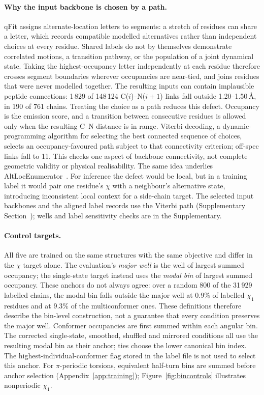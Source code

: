 \documentclass[10pt,twocolumn,a4paper]{article}
\begin{document}
\paragraph{Why the input backbone is chosen by a path.} qFit assigns alternate-location
letters to segments: a stretch of residues can share a letter, which records
compatible modelled alternatives rather than independent choices at every residue.
Shared labels do not by themselves demonstrate correlated motions, a transition
pathway, or the population of a joint dynamical state. Taking the
highest-occupancy letter independently at each residue therefore crosses segment
boundaries wherever occupancies are near-tied, and joins residues that were never
modelled together. The resulting inputs can contain implausible peptide connections: 1\,829
of 148\,124 C($i$)--N($i{+}1$) links fall outside 1.20--1.50\,\AA, in 190 of 761 chains.
Treating the choice as a path reduces this defect. Occupancy is the emission score,
and a transition between consecutive residues is allowed only when the resulting
C--N distance is in range. Viterbi decoding, a dynamic-programming algorithm for selecting the best connected sequence of choices, selects an occupancy-favoured path
subject to that connectivity criterion; off-spec links fall to 11. This checks one
aspect of backbone connectivity, not complete geometric validity or physical
realisability.
 The same idea underlies
AltLocEnumerator~\citep{gutermuth2023altloc}. For inference the defect would be local,
but in a training label it would pair one residue's $\chi$ with a neighbour's
alternative state, introducing inconsistent local context for a side-chain target.
The selected input backbones and the aligned label records use the Viterbi path (Supplementary Section~); wells and label sensitivity checks
are in the Supplementary.

\paragraph{Control targets.} All five are
trained on the same structures with the same objective and differ in the $\chi$ target
alone. The evaluation's \emph{major well} is the well of largest summed occupancy;
the single-state target instead uses the \emph{modal bin} of largest summed occupancy.
These anchors do not always agree: over a random 800 of the 31\,929 labelled chains,
the modal bin falls outside the major well at 0.9\% of labelled $\chi_1$ residues
and at 9.3\% of the multiconformer ones. These definitions therefore describe the
bin-level construction, not a guarantee that every condition preserves the major well.
Conformer occupancies are first summed within each angular bin. The corrected single-state, smoothed, shuffled and mirrored conditions all use the resulting modal bin as their anchor; ties choose the lower canonical bin index. The highest-individual-conformer flag stored in the label file is not used to select this anchor. For $\pi$-periodic torsions, equivalent half-turn bins are summed before anchor selection (Appendix~\ref{app:training}); Figure~\ref{fig:bincontrols} illustrates nonperiodic $\chi_1$.
\end{document}
